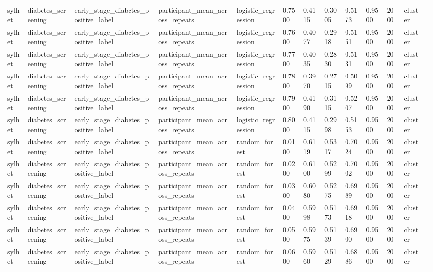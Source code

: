 \begin{tabular}{lllllllllllll}
sylhet & diabetes\_screening & early\_stage\_diabetes\_positive\_label & participant\_mean\_across\_repeats & logistic\_regression & 0.7500 & 0.4115 & 0.3005 & 0.5173 & 0.9500 & 2000 & cluster &  \\
sylhet & diabetes\_screening & early\_stage\_diabetes\_positive\_label & participant\_mean\_across\_repeats & logistic\_regression & 0.7600 & 0.4077 & 0.2918 & 0.5151 & 0.9500 & 2000 & cluster &  \\
sylhet & diabetes\_screening & early\_stage\_diabetes\_positive\_label & participant\_mean\_across\_repeats & logistic\_regression & 0.7700 & 0.4035 & 0.2830 & 0.5131 & 0.9500 & 2000 & cluster &  \\
sylhet & diabetes\_screening & early\_stage\_diabetes\_positive\_label & participant\_mean\_across\_repeats & logistic\_regression & 0.7800 & 0.3970 & 0.2715 & 0.5099 & 0.9500 & 2000 & cluster &  \\
sylhet & diabetes\_screening & early\_stage\_diabetes\_positive\_label & participant\_mean\_across\_repeats & logistic\_regression & 0.7900 & 0.4190 & 0.3115 & 0.5207 & 0.9500 & 2000 & cluster &  \\
sylhet & diabetes\_screening & early\_stage\_diabetes\_positive\_label & participant\_mean\_across\_repeats & logistic\_regression & 0.8000 & 0.4115 & 0.2998 & 0.5153 & 0.9500 & 2000 & cluster &  \\
sylhet & diabetes\_screening & early\_stage\_diabetes\_positive\_label & participant\_mean\_across\_repeats & random\_forest & 0.0100 & 0.6119 & 0.5317 & 0.7024 & 0.9500 & 2000 & cluster &  \\
sylhet & diabetes\_screening & early\_stage\_diabetes\_positive\_label & participant\_mean\_across\_repeats & random\_forest & 0.0200 & 0.6100 & 0.5299 & 0.7002 & 0.9500 & 2000 & cluster &  \\
sylhet & diabetes\_screening & early\_stage\_diabetes\_positive\_label & participant\_mean\_across\_repeats & random\_forest & 0.0300 & 0.6080 & 0.5275 & 0.6989 & 0.9500 & 2000 & cluster &  \\
sylhet & diabetes\_screening & early\_stage\_diabetes\_positive\_label & participant\_mean\_across\_repeats & random\_forest & 0.0400 & 0.5998 & 0.5173 & 0.6918 & 0.9500 & 2000 & cluster &  \\
sylhet & diabetes\_screening & early\_stage\_diabetes\_positive\_label & participant\_mean\_across\_repeats & random\_forest & 0.0500 & 0.5975 & 0.5139 & 0.6900 & 0.9500 & 2000 & cluster &  \\
sylhet & diabetes\_screening & early\_stage\_diabetes\_positive\_label & participant\_mean\_across\_repeats & random\_forest & 0.0600 & 0.5960 & 0.5129 & 0.6886 & 0.9500 & 2000 & cluster &  \\

\end{tabular}
